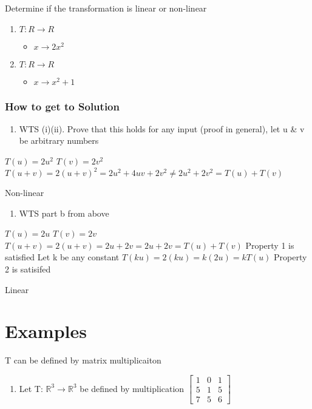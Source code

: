 \documentclass[11pt]{article}
\begin{document}
Determine if the transformation is linear or non-linear
\begin{enumerate}
\item \(T: R \rightarrow{} R\)
\begin{itemize}
\item \(x \rightarrow{} 2x^{2}\)
\end{itemize}
\item \(T: R \rightarrow{} R\)
\begin{itemize}
\item \(x \rightarrow{} x^{2} + 1\)
\end{itemize}
\end{enumerate}
\subsubsection{How to get to Solution}
\label{sec:orgbae065c}
\begin{enumerate}
\item WTS (i)(ii). Prove that this holds for any input (proof in general), let u \& v be arbitrary numbers
\end{enumerate}
\(T(u) = 2u^{2}\)
\(T(v) = 2v^{2}\)
\(T(u+v) = 2(u+v)^{2} = 2u^{2} + 4uv + 2v^{2} \neq 2u^{2} + 2v^{2} = T(u) + T(v)\)

Non-linear

\begin{enumerate}
\item WTS part b from above
\end{enumerate}
\(T(u) = 2u\)
\(T(v) = 2v\)
\(T(u+v) = 2(u+v) = 2u + 2v = 2u + 2v = T(u) + T(v)\)
Property 1 is satisfied
Let k be any constant
\(T(ku) = 2(ku) = k(2u) = kT(u)\)
Property 2 is satisifed

Linear
\section{Examples}
\label{sec:orgd133af7}
T can be defined by matrix multiplicaiton
\begin{enumerate}
\item Let T: \(\mathbb{R}^{3} \rightarrow{} \mathbb{R}^{3}\) be defined by multiplication \(\begin{bmatrix}1&0&1\\5&1&5\\7&5&6\end{bmatrix}\)
\end{enumerate}
\end{document}
